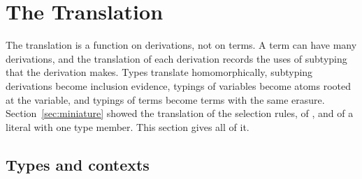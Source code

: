 \mathtgt
\section{The Translation}\label{sec:translation}

The translation is a function on derivations, not on terms. A term can have many derivations, and the translation of each derivation records the uses of subtyping that the derivation makes. Types translate homomorphically, subtyping derivations become inclusion evidence, typings of variables become atoms rooted at the variable, and typings of terms become terms with the same erasure. Section~\ref{sec:miniature} showed the translation of the selection rules, of , and of a literal with one type member. This section gives all of it.

\subsection{Types and contexts}

